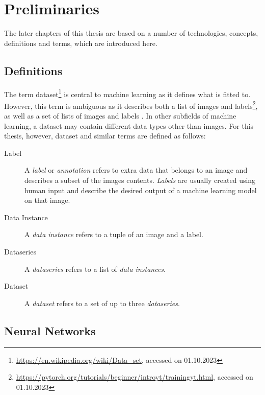 \documentclass[10pt]{book}
\begin{document}
\chapter{Preliminaries}
\label{chap:prelim}

The later chapters of this thesis are based on a number of technologies, concepts, definitions and terms, which are introduced here.

\section{Definitions}

The term dataset\footnote{\url{https://en.wikipedia.org/wiki/Data_set}, accessed on 01.10.2023} is central to machine learning as it defines what is fitted to. However, this term is ambiguous as it describes both a list of images and labels\footnote{\url{https://pytorch.org/tutorials/beginner/introyt/trainingyt.html}, accessed on 01.10.2023}, as well as a set of lists of images and labels \cite{lin2014microsoft}. In other subfields of machine learning, a dataset may contain different data types other than images. For this thesis, however, dataset and similar terms are defined as follows:

\begin{description}
  \item[Label] A \textit{label} or \textit{annotation} refers to extra data that belongs to an image and describes a subset of the images contents. \textit{Labels} are usually created using human input and describe the desired output of a machine learning model on that image.
  \item[Data Instance] A \textit{data instance} refers to a tuple of an image and a label.
  \item[Dataseries] A \textit{dataseries} refers to a list of \textit{data instances}.
  \item[Dataset] A \textit{dataset} refers to a set of up to three \textit{dataseries}.
\end{description}

\section{Neural Networks}
\end{document}
